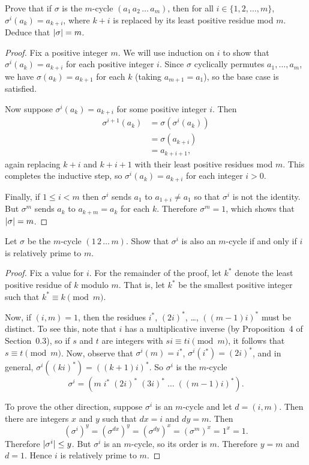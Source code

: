  Prove that if $\sigma$ is the $m$-cycle
$(a_1\,a_2\,\dots\,a_m)$, then for all $i\in\{1,2,\dots,m\}$,
$\sigma^i(a_k) = a_{k+i}$, where $k+i$ is replaced by its least
positive residue mod $m$. Deduce that $\lvert{\sigma}\rvert = m$.
\begin{proof}
  Fix a positive integer $m$. We will use induction on $i$ to show
  that $\sigma^i(a_k) = a_{k+i}$ for each positive integer $i$. Since
  $\sigma$ cyclically permutes $a_1,\dots,a_m$, we have
  $\sigma(a_k) = a_{k+1}$ for each $k$ (taking $a_{m+1} = a_1$), so
  the base case is satisfied.

  Now suppose $\sigma^i(a_k) = a_{k+i}$ for some positive integer
  $i$. Then
  \begin{align*}
    \sigma^{i+1}(a_k) &= \sigma(\sigma^i(a_k)) \\
                      &= \sigma(a_{k+i}) \\
                      &= a_{k+i+1},
  \end{align*}
  again replacing $k+i$ and $k+i+1$ with their least positive residues
  mod $m$. This completes the inductive step, so
  $\sigma^i(a_k) = a_{k+i}$ for each integer $i > 0$.

  Finally, if $1\leq i<m$ then $\sigma^i$ sends $a_1$ to
  $a_{1+i}\neq a_1$ so that $\sigma^i$ is not the identity. But
  $\sigma^m$ sends $a_k$ to $a_{k+m} = a_k$ for each $k$. Therefore
  $\sigma^m = 1$, which shows that $\lvert{\sigma}\rvert = m$.
\end{proof}

 Let $\sigma$ be the $m$-cycle $(1\,2\,\dots\,m)$. Show
that $\sigma^i$ is also an $m$-cycle if and only if $i$ is relatively
prime to $m$.
\begin{proof}
  Fix a value for $i$. For the remainder of the proof, let $k^*$
  denote the least positive residue of $k$ modulo $m$. That is, let
  $k^*$ be the smallest positive integer such that
  $k^*\equiv k\pmod m$.

  Now, if $(i,m) = 1$, then the residues $i^*$, $(2i)^*$, \dots,
  $((m-1)i)^*$ must be distinct. To see this, note that $i$ has a
  multiplicative inverse (by Proposition~4 of Section~0.3), so if $s$
  and $t$ are integers with $si\equiv ti\pmod m$, it follows that
  $s\equiv t\pmod m$. Now, observe that $\sigma^i(m) = i^*$,
  $\sigma^i(i^*) = (2i)^*$, and in general,
  $\sigma^i((ki)^*) = ((k+1)i)^*$. So $\sigma^i$ is the $m$-cycle
  \begin{equation*}
    \sigma^i = (m\;i^*\;(2i)^*\;(3i)^*\;\dots\;((m-1)i)^*).
  \end{equation*}

  To prove the other direction, suppose $\sigma^i$ is an $m$-cycle and
  let $d = (i, m)$. Then there are integers $x$ and $y$ such that
  $dx = i$ and $dy = m$. Then
  \begin{equation*}
    (\sigma^i)^y = (\sigma^{dx})^y
    = (\sigma^{dy})^x = (\sigma^m)^x = 1^x = 1.
  \end{equation*}
  Therefore $\lvert{\sigma^i}\rvert \leq y$. But $\sigma^i$ is an $m$-cycle,
  so its order is $m$. Therefore $y = m$ and $d = 1$. Hence $i$ is
  relatively prime to $m$.
\end{proof}

